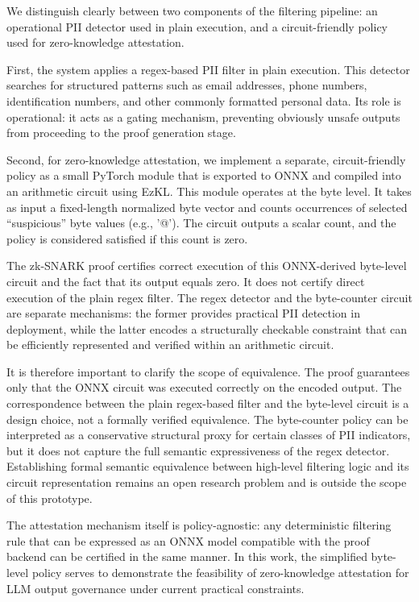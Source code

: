 \documentclass[10pt,conference,a4paper]{IEEEtran}
\begin{document}
We distinguish clearly between two components of the filtering pipeline: an operational PII detector used in plain execution, and a circuit-friendly policy used for zero-knowledge attestation.

First, the system applies a regex-based PII filter in plain execution. This detector searches for structured patterns such as email addresses, phone numbers, identification numbers, and other commonly formatted personal data. Its role is operational: it acts as a gating mechanism, preventing obviously unsafe outputs from proceeding to the proof generation stage.

Second, for zero-knowledge attestation, we implement a separate, circuit-friendly policy as a small PyTorch module that is exported to ONNX and compiled into an arithmetic circuit using EzKL. This module operates at the byte level. It takes as input a fixed-length normalized byte vector and counts occurrences of selected “suspicious” byte values (e.g., '@'). The circuit outputs a scalar count, and the policy is considered satisfied if this count is zero.

The zk-SNARK proof certifies correct execution of this ONNX-derived byte-level circuit and the fact that its output equals zero. It does not certify direct execution of the plain regex filter. The regex detector and the byte-counter circuit are separate mechanisms: the former provides practical PII detection in deployment, while the latter encodes a structurally checkable constraint that can be efficiently represented and verified within an arithmetic circuit.

It is therefore important to clarify the scope of equivalence. The proof guarantees only that the ONNX circuit was executed correctly on the encoded output. The correspondence between the plain regex-based filter and the byte-level circuit is a design choice, not a formally verified equivalence. The byte-counter policy can be interpreted as a conservative structural proxy for certain classes of PII indicators, but it does not capture the full semantic expressiveness of the regex detector. Establishing formal semantic equivalence between high-level filtering logic and its circuit representation remains an open research problem and is outside the scope of this prototype.

The attestation mechanism itself is policy-agnostic: any deterministic filtering rule that can be expressed as an ONNX model compatible with the proof backend can be certified in the same manner. In this work, the simplified byte-level policy serves to demonstrate the feasibility of zero-knowledge attestation for LLM output governance under current practical constraints.
\end{document}
